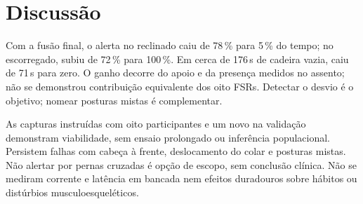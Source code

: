 \section{Discussão}
\label{sec:res-discussao}

Com a fusão final, o alerta no reclinado caiu de 78\,\% para 5\,\%
do tempo; no escorregado, subiu de 72\,\% para 100\,\%. Em cerca de
176\,s de cadeira vazia, caiu de 71\,s para zero. O ganho decorre do
apoio e da presença medidos no assento; não se demonstrou contribuição
equivalente dos oito FSRs. Detectar o desvio é o objetivo; nomear posturas
mistas é complementar.

As capturas instruídas com oito participantes e um novo na validação
demonstram viabilidade, sem ensaio prolongado ou inferência populacional.
Persistem falhas com cabeça à frente, deslocamento do colar e posturas
mistas. Não alertar por pernas cruzadas é opção de escopo, sem conclusão
clínica. Não se mediram corrente e latência em bancada nem efeitos
duradouros sobre hábitos ou distúrbios musculoesqueléticos.
